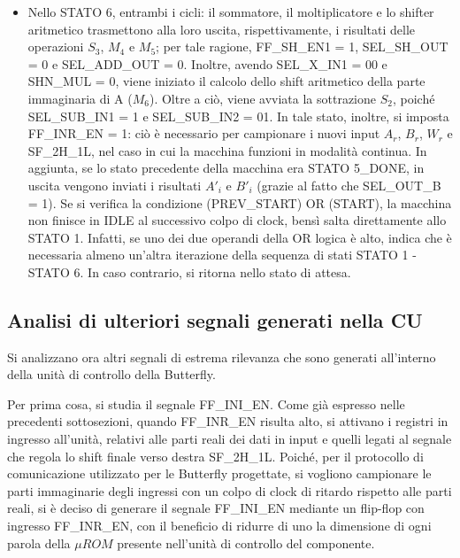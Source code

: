 \begin{itemize}
\noindent Ciclo precedente: si manda ad arrotondare $S_6$, per ottenere l'uscita $B'_i$, pronta ad essere salvata nel registro a valle del sottrattore.

\noindent Nello STATO 5\_DONE si attiva il segnale esterno DONE, dato che EN\_DONE = 1 e Y = 1. In questo stato, la butterfly manda verso l'esterno due segnali validi su 24 bit, ovvero le parti reali dei risultati dell'elaborazione. Nello STATO 5\_NODONE, invece, EN\_DONE =  0: non viene generato alcun segnale di DONE, poiché non si hanno dati pronti. 


\item  Nello STATO 6, entrambi i cicli: il sommatore, il moltiplicatore e lo shifter aritmetico trasmettono alla loro uscita, rispettivamente, i risultati delle operazioni $S_3$, $M_4$ e $M_5$; per tale ragione, FF\_SH\_EN1 = 1, SEL\_SH\_OUT = 0 e SEL\_ADD\_OUT = 0. Inoltre, avendo SEL\_X\_IN1  = 00 e SHN\_MUL = 0, viene iniziato il calcolo dello shift aritmetico della parte immaginaria di A ($M_6$). Oltre a ciò, viene avviata la sottrazione $S_2$, poiché SEL\_SUB\_IN1 = 1 e SEL\_SUB\_IN2 = 01.
In tale stato, inoltre, si imposta FF\_INR\_EN = 1: ciò è necessario per campionare i nuovi input $A_r$, $B_r$, $W_r$ e SF\_2H\_1L, nel caso in cui la macchina funzioni in modalità continua. In aggiunta, se lo stato precedente della macchina era STATO 5\_DONE, in uscita vengono inviati i risultati $A'_i$ e $B'_i$ (grazie al fatto che SEL\_OUT\_B = 1).
Se si verifica la condizione (PREV\_START) OR (START), la macchina non finisce in IDLE al successivo colpo di clock, bensì salta direttamente allo STATO 1. Infatti, se uno dei due operandi della OR logica è alto, indica che è necessaria almeno un'altra iterazione della sequenza di stati STATO 1  -  STATO 6. In caso contrario, si ritorna nello stato di attesa. 

\end{itemize}


\subsection{Analisi di ulteriori segnali generati nella CU}
\label{subsec:Y,PREV_START,DONE}
\noindent Si analizzano ora altri segnali di estrema rilevanza che sono generati all'interno della unità di controllo della Butterfly.

\noindent Per prima cosa, si studia il segnale FF\_INI\_EN. Come già espresso nelle precedenti sottosezioni, quando FF\_INR\_EN risulta alto, si attivano i registri in ingresso all'unità, relativi alle parti reali dei dati in input e quelli legati al segnale che regola lo shift finale verso destra SF\_2H\_1L. Poiché, per il protocollo di comunicazione utilizzato per le Butterfly progettate, si vogliono campionare le parti immaginarie degli ingressi con un colpo di clock di ritardo rispetto alle parti reali, si è deciso di generare il segnale FF\_INI\_EN mediante un flip-flop con ingresso FF\_INR\_EN, con il beneficio di ridurre di uno la dimensione di ogni parola della $\mu ROM$ presente nell'unità di controllo del componente.

